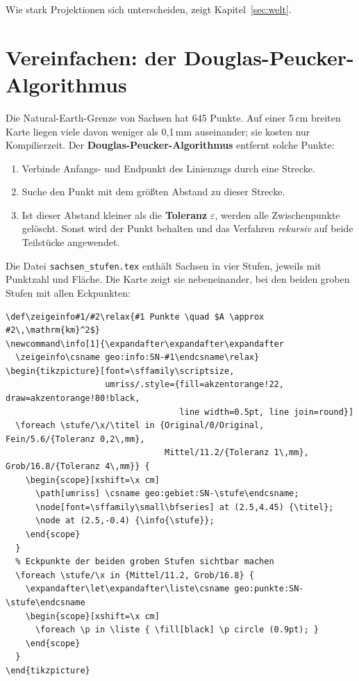Wie stark Projektionen sich unterscheiden, zeigt Kapitel~\ref{sec:welt}.



\section{Vereinfachen: der Douglas-Peucker-Algorithmus}\label{sec:dp}

Die Natural-Earth-Grenze von Sachsen hat 645 Punkte. Auf einer 5\,cm breiten Karte liegen viele davon weniger als 0,1\,mm auseinander; sie kosten nur Kompilierzeit. Der \textbf{Douglas-Peucker-Algorithmus} entfernt solche Punkte:

\begin{enumerate}
	\item Verbinde Anfangs- und Endpunkt des Linienzugs durch eine Strecke.
	\item Suche den Punkt mit dem größten Abstand zu dieser Strecke.
	\item Ist dieser Abstand kleiner als die \textbf{Toleranz} $\varepsilon$, werden alle Zwischenpunkte gelöscht. Sonst wird der Punkt behalten und das Verfahren \textit{rekursiv} auf beide Teilstücke angewendet.
\end{enumerate}

Die Datei \texttt{sachsen\_stufen.tex} enthält Sachsen in vier Stufen, jeweils mit Punktzahl und Fläche. Die Karte zeigt sie nebeneinander, bei den beiden groben Stufen mit allen Eckpunkten:

\begin{lstlisting}[style=latex]
% Präambel: 
\def\zeigeinfo#1/#2\relax{#1 Punkte \quad $A \approx #2\,\mathrm{km}^2$}
\newcommand\info[1]{\expandafter\expandafter\expandafter
  \zeigeinfo\csname geo:info:SN-#1\endcsname\relax}
\begin{tikzpicture}[font=\sffamily\scriptsize,
                    umriss/.style={fill=akzentorange!22, draw=akzentorange!80!black,
                                   line width=0.5pt, line join=round}]
  \foreach \stufe/\x/\titel in {Original/0/Original, Fein/5.6/{Toleranz 0,2\,mm},
                                Mittel/11.2/{Toleranz 1\,mm}, Grob/16.8/{Toleranz 4\,mm}} {
    \begin{scope}[xshift=\x cm]
      \path[umriss] \csname geo:gebiet:SN-\stufe\endcsname;
      \node[font=\sffamily\small\bfseries] at (2.5,4.45) {\titel};
      \node at (2.5,-0.4) {\info{\stufe}};
    \end{scope}
  }
  % Eckpunkte der beiden groben Stufen sichtbar machen
  \foreach \stufe/\x in {Mittel/11.2, Grob/16.8} {
    \expandafter\let\expandafter\liste\csname geo:punkte:SN-\stufe\endcsname
    \begin{scope}[xshift=\x cm]
      \foreach \p in \liste { \fill[black] \p circle (0.9pt); }
    \end{scope}
  }
\end{tikzpicture}
\end{lstlisting}

